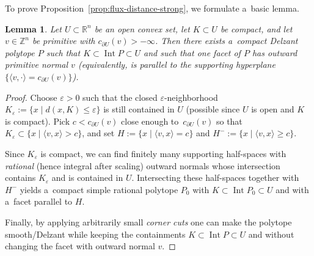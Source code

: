 \documentclass[10pt,a4paper]{amsart}
\numberwithin{equation}{section}
\newcommand{\bR}{{\mathbb R}}
\newcommand{\bZ}{{\mathbb Z}}
\newtheorem{lm}[Theorem]{Lemma}
\theoremstyle{definition}
\begin{document}
To prove Proposition~\ref{prop:flux-distance-strong}, we formulate a~basic lemma.
 \begin{lm}\label{lemma2.11}
 Let $U\subset\bR^n$ be an open convex set, let ${K\subset U}$ be compact, and let ${v\in\bZ^n}$ be primitive with $c_{\partial U}(v)>-\infty$.
 Then there exists a~compact Delzant polytope $P$ such that $K\subset \operatorname{Int} P\subset U$ and such that one facet of $P$ has outward primitive normal $v$ {\rm(}equivalently, is parallel to the supporting hyperplane $\{\langle v,\cdot\rangle=c_{\partial U}(v)\}${\rm)}.
 \end{lm}
\begin{proof}
Choose $\varepsilon>0$ such that the closed $\varepsilon$-neighborhood $K_\varepsilon:=\{x\mid d(x,K)\le \varepsilon\}$ is still contained in $U$ (possible since $U$ is open and $K$ is compact).
Pick $c<c_{\partial U}(v)$ close enough to~$c_{\partial U}(v)$ so that $K_\varepsilon\subset\{x\mid \langle v,x\rangle>c\}$, and set $H:=\{x\mid \langle v,x\rangle=c\}$ and $H^-:=\{x\mid \langle v,x\rangle\ge c\}$.

Since $K_\varepsilon$ is compact, we can find finitely many supporting half-spaces with \emph{rational} (hence integral after scaling) outward normals whose intersection contains $K_\varepsilon$ and is contained in $U$. Intersecting these half-spaces together with $H^{-}$ yields a~compact simple rational polytope $P_0$ with $K\subset \operatorname{Int} P_0\subset U$ and with a~facet parallel to $H$.

Finally, by applying arbitrarily small \emph{corner cuts} one can make the polytope smooth/Delzant while keeping the containments $K\subset \operatorname{Int} P\subset U$ and without changing the facet with outward normal $v$.
\end{proof}
\end{document}
